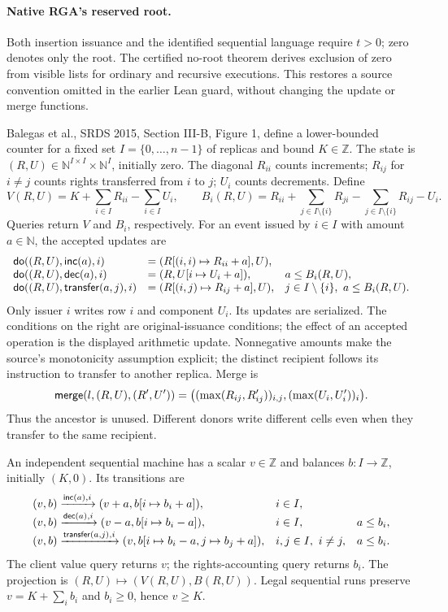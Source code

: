 \paragraph{Native RGA's reserved root.}\label{par:rga-root}
Both insertion issuance and the identified sequential language require $t>0$;
zero denotes only the root. The certified no-root theorem derives exclusion
of zero from visible lists for ordinary and recursive executions. This restores
a source convention omitted in the earlier Lean guard, without changing the
update or merge functions.

\begin{example}\label{ex:balegas-counter}
Balegas et al., SRDS 2015, Section III-B, Figure 1, define a lower-bounded
counter for a fixed set $I=\{0,\ldots,n-1\}$ of replicas and bound $K\in\mathbb Z$.
The state is $(R,U)\in\mathbb N^{I\times I}\times\mathbb N^I$, initially zero.
The diagonal $R_{ii}$ counts increments; $R_{ij}$ for $i\ne j$ counts rights
transferred from $i$ to $j$; $U_i$ counts decrements. Define
\[
 V(R,U)=K+\sum_{i\in I}R_{ii}-\sum_{i\in I}U_i,\qquad
 B_i(R,U)=R_{ii}+\sum_{j\in I\setminus\{i\}}R_{ji}
                 -\sum_{j\in I\setminus\{i\}}R_{ij}-U_i.
\]
Queries return $V$ and $B_i$, respectively. For an event issued by $i\in I$
with amount $a\in\mathbb N$, the accepted updates are
\[
\begin{array}{lll}
 \mathsf{do}((R,U),\mathsf{inc}(a),i)&=(R[(i,i)\mapsto R_{ii}+a],U),&\\
 \mathsf{do}((R,U),\mathsf{dec}(a),i)&=(R,U[i\mapsto U_i+a]),&a\le B_i(R,U),\\
 \mathsf{do}((R,U),\mathsf{transfer}(a,j),i)&=(R[(i,j)\mapsto R_{ij}+a],U),&
 j\in I\setminus\{i\},\ a\le B_i(R,U).
\end{array}
\]
Only issuer $i$ writes row $i$ and component $U_i$. Its updates are serialized.
The conditions on the right are original-issuance conditions; the effect of an
accepted operation is the displayed arithmetic update. Nonnegative amounts
make the source's monotonicity assumption explicit; the distinct recipient
follows its instruction to transfer to another replica. Merge is
\[
 \mathsf{merge}(l,(R,U),(R',U'))=
 \bigl((\max(R_{ij},R'_{ij}))_{i,j},(\max(U_i,U'_i))_i\bigr).
\]
Thus the ancestor is unused. Different donors write different cells even when
they transfer to the same recipient.

An independent sequential machine has a scalar $v\in\mathbb Z$ and balances
$b:I\to\mathbb Z$, initially $(K,0)$. Its transitions are
\[
\begin{array}{lll}
 (v,b)\xrightarrow{\mathsf{inc}(a),i}(v+a,b[i\mapsto b_i+a]),&i\in I,&\\
 (v,b)\xrightarrow{\mathsf{dec}(a),i}(v-a,b[i\mapsto b_i-a]),&i\in I,&a\le b_i,\\
 (v,b)\xrightarrow{\mathsf{transfer}(a,j),i}
 (v,b[i\mapsto b_i-a,j\mapsto b_j+a]),&i,j\in I,\ i\ne j,&a\le b_i.
\end{array}
\]
The client value query returns $v$; the rights-accounting query returns $b_i$.
The projection is $(R,U)\mapsto(V(R,U),B(R,U))$.
Legal sequential runs preserve $v=K+\sum_i b_i$ and $b_i\ge0$, hence $v\ge K$.


\end{example}
